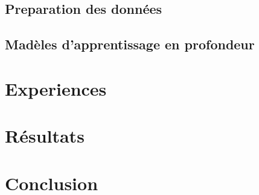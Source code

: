 \subsection{Preparation des données}
\subsection{Madèles d'apprentissage en profondeur}

\section{Experiences}

\section{Résultats}

\section*{Conclusion}